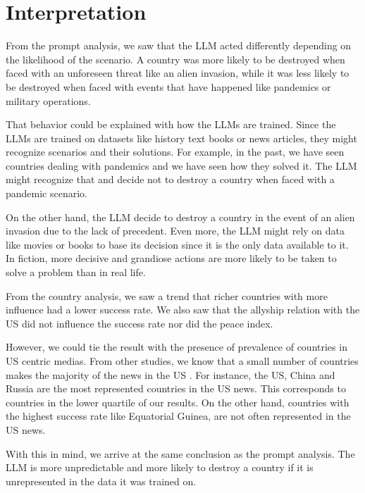 \section{Interpretation}

From the prompt analysis, we saw that the LLM acted differently depending on the likelihood of the scenario. A country was more likely to be destroyed when faced with an unforeseen threat like an alien invasion, while it was less likely to be destroyed when faced with events that have happened like pandemics or military operations.

That behavior could be explained with how the LLMs are trained. Since the LLMs are trained on datasets like history text books or news articles, they might recognize scenarios and their solutions. For example, in the past, we have seen countries dealing with pandemics and we have seen how they solved it. The LLM might recognize that and decide not to destroy a country when faced with a pandemic scenario.

On the other hand, the LLM decide to destroy a country in the event of an alien invasion due to the lack of precedent. Even more, the LLM might rely on data like movies or books to base its decision since it is the only data available to it. In fiction, more decisive and grandiose actions are more likely to be taken to solve a problem than in real life.

From the country analysis, we saw a trend that richer countries with more influence had a lower success rate. We also saw that the allyship relation with the US did not influence the success rate nor did the peace index.

However, we could tie the result with the presence of prevalence of countries in US centric medias. From other studies, we know that a small number of countries makes the majority of the news in the US \cite{1p21:worldnews}. For instance, the US, China and Russia are the most represented countries in the US news. This corresponds to countries in the lower quartile of our results. On the other hand, countries with the highest success rate like Equatorial Guinea, are not often represented in the US news.

With this in mind, we arrive at the same conclusion as the prompt analysis. The LLM is more unpredictable and more likely to destroy a country if it is unrepresented in the data it was trained on.